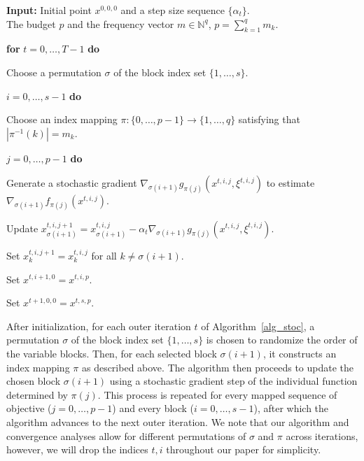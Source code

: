 \documentclass[11pt,a4paper]{article}
\numberwithin{equation}{section}%
\renewcommand{\(}{\left (}
\renewcommand{\)}{\right )}
\begin{document}
\begin{algorithm}[ht]
\caption{Block-SMOO Algorithm} 
\label{alg_stoc} 
\begin{algorithmic}[1]
\item \textbf{Input:} Initial point $x^{0,0,0}$ and a step size sequence $\{\alpha_t\}$. \\
The budget $p$ and the frequency vector $m \in \mathbb{N}^q$, $p = \sum_{k=1}^q m_k$.
\item {\bf for} $t = 0, \ldots, T-1$ {\bf do}
\item \quad Choose a permutation $\sigma$ of the block index set $\{1,\dots, s\}$.
\item {} $i = 0, \ldots, s-1$ {\bf do}
\item \quad \quad Choose an index mapping $\pi: \{0, \dots, p-1\} \to \{1,\dots, q\}$ satisfying that $|\pi^{-1}(k)| = m_k$.
\item \quad {} $j = 0, \ldots, p-1$ {\bf do}
\item \quad \quad \quad Generate a stochastic gradient $ \nabla_{\sigma(i+1)} g_{\pi(j)} (x^{t,i,j}, \xi^{t,i,j})$ to estimate $\nabla_{\sigma(i+1)} f_{\pi(j)} (x^{t,i,j})$. 
\item \quad \quad \quad Update $x_{\sigma(i+1)}^{t,i,j+1} = x_{\sigma(i+1)}^{t,i,j} - \alpha_t \nabla_{\sigma(i+1)} g_{\pi(j)} (x^{t,i,j}, \xi^{t,i,j})$.
\item \quad \quad \quad Set $x_{k}^{t,i,j+1} = x_{k}^{t,i,j}$ for all $k \neq \sigma(i+1)$.
\item \quad \quad Set $x^{t,i+1,0} = x^{t,i,p}$. 
\item \quad Set $x^{t+1,0,0} = x^{t,s,p}$.
\par\vspace*{0.1cm}
\end{algorithmic}
\end{algorithm}

After initialization, for each outer iteration $t$ of Algorithm~\ref{alg_stoc}, a permutation $\sigma$ of the block index set $\{1, \dots, s\}$ is chosen to randomize the order of the variable blocks.
Then, for each selected block $\sigma(i+1)$, it constructs an index mapping $\pi$
as described above. The algorithm then proceeds to update the chosen block $\sigma(i+1)$ using a stochastic gradient step of the individual function determined by $\pi(j)$. This process is repeated for every mapped sequence of objective ($j = 0, \dots, p-1$) and every block ($i = 0, \dots, s-1$), after which the algorithm advances to the next outer iteration. We note that our algorithm and convergence analyses allow for different permutations of $\sigma$ and $\pi$ across iterations, however, we will drop the indices $t, i$ throughout our paper for simplicity.
\end{document}
